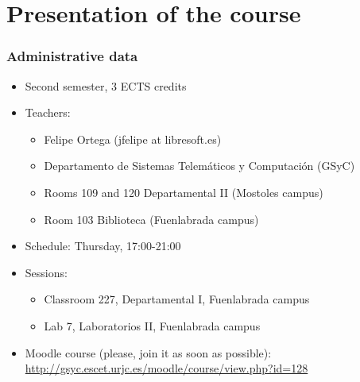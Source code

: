 

\section{Presentation of the course}


\begin{frame}
\frametitle{Administrative data}

\begin{itemize}
\item Second semester, 3 ECTS credits
\item Teachers:
  \begin{itemize}
  \item Felipe Ortega (jfelipe at libresoft.es)
  \item Departamento de Sistemas Telemáticos y Computación (GSyC)
  \item Rooms 109 and 120 Departamental II (Mostoles campus)
  \item Room 103 Biblioteca (Fuenlabrada campus)
  \end{itemize}
\item Schedule: Thursday, 17:00-21:00
\item Sessions:
  \begin{itemize}
  \item Classroom 227, Departamental I, Fuenlabrada campus
  \item Lab 7, Laboratorios II, Fuenlabrada campus
  \end{itemize}
\item Moodle course (please, join it as soon as possible): \\
  \url{http://gsyc.escet.urjc.es/moodle/course/view.php?id=128}
\end{itemize}
\end{frame}


